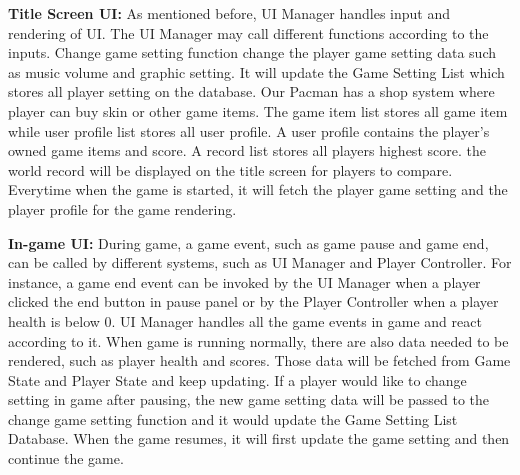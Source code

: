 \documentclass[11pt]{article}
\begin{document}
\textbf{Title Screen UI:} As mentioned before, UI Manager handles input and rendering of UI. The UI Manager may call different functions according to the inputs. Change game setting function change the player game setting data such as music volume and graphic setting. It will update the Game Setting List which stores all player setting on the database. Our Pacman has a shop system where player can buy skin or other game items. The game item list stores all game item while user profile list stores all user profile. A user profile contains the player's owned game items and score. A record list stores all players highest score. the world record will be displayed on the title screen for players to compare. Everytime when the game is started, it will fetch the player game setting and the player profile for the game rendering.

\textbf{In-game UI:} During game, a game event, such as game pause and game end, can be called by different systems, such as UI Manager and Player Controller. For instance, a game end event can be invoked by the UI Manager when a player clicked the end button in pause panel or by the Player Controller when a player health is below 0. UI Manager handles all the game events in game and react according to it. When game is running normally, there are also data needed to be rendered, such as player health and scores. Those data will be fetched from Game State and Player State and keep updating. If a player would like to change setting in game after pausing, the new game setting data will be passed to the change game setting function and it would update the Game Setting List Database. When the game resumes, it will first update the game setting and then continue the game.
\end{document}
